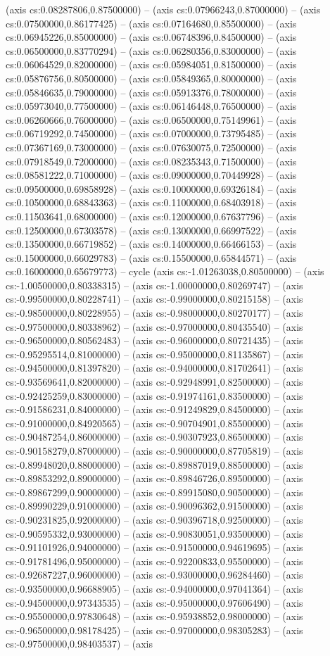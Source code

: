 (axis cs:0.08287806,0.87500000) -- (axis cs:0.07966243,0.87000000) -- (axis cs:0.07500000,0.86177425) -- (axis cs:0.07164680,0.85500000) -- (axis cs:0.06945226,0.85000000) -- (axis cs:0.06748396,0.84500000) -- (axis cs:0.06500000,0.83770294) -- (axis cs:0.06280356,0.83000000) -- (axis cs:0.06064529,0.82000000) -- (axis cs:0.05984051,0.81500000) -- (axis cs:0.05876756,0.80500000) -- (axis cs:0.05849365,0.80000000) -- (axis cs:0.05846635,0.79000000) -- (axis cs:0.05913376,0.78000000) -- (axis cs:0.05973040,0.77500000) -- (axis cs:0.06146448,0.76500000) -- (axis cs:0.06260666,0.76000000) -- (axis cs:0.06500000,0.75149961) -- (axis cs:0.06719292,0.74500000) -- (axis cs:0.07000000,0.73795485) -- (axis cs:0.07367169,0.73000000) -- (axis cs:0.07630075,0.72500000) -- (axis cs:0.07918549,0.72000000) -- (axis cs:0.08235343,0.71500000) -- (axis cs:0.08581222,0.71000000) -- (axis cs:0.09000000,0.70449928) -- (axis cs:0.09500000,0.69858928) -- (axis cs:0.10000000,0.69326184) -- (axis cs:0.10500000,0.68843363) -- (axis cs:0.11000000,0.68403918) -- (axis cs:0.11503641,0.68000000) -- (axis cs:0.12000000,0.67637796) -- (axis cs:0.12500000,0.67303578) -- (axis cs:0.13000000,0.66997522) -- (axis cs:0.13500000,0.66719852) -- (axis cs:0.14000000,0.66466153) -- (axis cs:0.15000000,0.66029783) -- (axis cs:0.15500000,0.65844571) -- (axis cs:0.16000000,0.65679773) -- cycle (axis cs:-1.01263038,0.80500000) -- (axis cs:-1.00500000,0.80338315) -- (axis cs:-1.00000000,0.80269747) -- (axis cs:-0.99500000,0.80228741) -- (axis cs:-0.99000000,0.80215158) -- (axis cs:-0.98500000,0.80228955) -- (axis cs:-0.98000000,0.80270177) -- (axis cs:-0.97500000,0.80338962) -- (axis cs:-0.97000000,0.80435540) -- (axis cs:-0.96500000,0.80562483) -- (axis cs:-0.96000000,0.80721435) -- (axis cs:-0.95295514,0.81000000) -- (axis cs:-0.95000000,0.81135867) -- (axis cs:-0.94500000,0.81397820) -- (axis cs:-0.94000000,0.81702641) -- (axis cs:-0.93569641,0.82000000) -- (axis cs:-0.92948991,0.82500000) -- (axis cs:-0.92425259,0.83000000) -- (axis cs:-0.91974161,0.83500000) -- (axis cs:-0.91586231,0.84000000) -- (axis cs:-0.91249829,0.84500000) -- (axis cs:-0.91000000,0.84920565) -- (axis cs:-0.90704901,0.85500000) -- (axis cs:-0.90487254,0.86000000) -- (axis cs:-0.90307923,0.86500000) -- (axis cs:-0.90158279,0.87000000) -- (axis cs:-0.90000000,0.87705819) -- (axis cs:-0.89948020,0.88000000) -- (axis cs:-0.89887019,0.88500000) -- (axis cs:-0.89853292,0.89000000) -- (axis cs:-0.89846726,0.89500000) -- (axis cs:-0.89867299,0.90000000) -- (axis cs:-0.89915080,0.90500000) -- (axis cs:-0.89990229,0.91000000) -- (axis cs:-0.90096362,0.91500000) -- (axis cs:-0.90231825,0.92000000) -- (axis cs:-0.90396718,0.92500000) -- (axis cs:-0.90595332,0.93000000) -- (axis cs:-0.90830051,0.93500000) -- (axis cs:-0.91101926,0.94000000) -- (axis cs:-0.91500000,0.94619695) -- (axis cs:-0.91781496,0.95000000) -- (axis cs:-0.92200833,0.95500000) -- (axis cs:-0.92687227,0.96000000) -- (axis cs:-0.93000000,0.96284460) -- (axis cs:-0.93500000,0.96688905) -- (axis cs:-0.94000000,0.97041364) -- (axis cs:-0.94500000,0.97343535) -- (axis cs:-0.95000000,0.97606490) -- (axis cs:-0.95500000,0.97830648) -- (axis cs:-0.95938852,0.98000000) -- (axis cs:-0.96500000,0.98178425) -- (axis cs:-0.97000000,0.98305283) -- (axis cs:-0.97500000,0.98403537) -- (axis 
